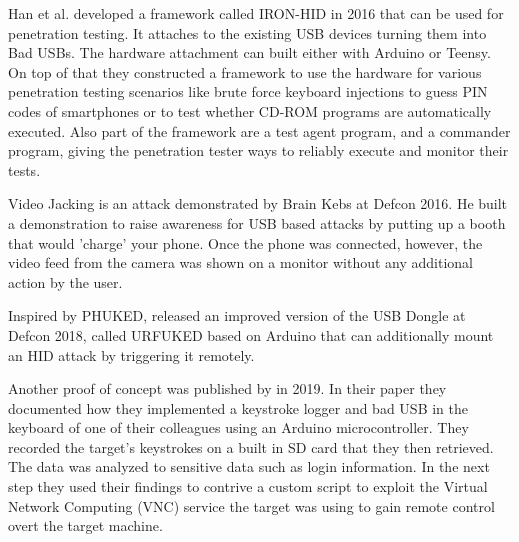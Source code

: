 Han et al.\cite{hanIRONHIDCreateYour2016} developed a framework called IRON-HID in 2016 that can be used for penetration testing. It attaches to the existing USB devices turning them into Bad USBs. The hardware attachment can built either with Arduino or Teensy. On top of that they constructed a framework to use the hardware for various penetration testing scenarios like brute force keyboard injections to guess PIN codes of smartphones or to test whether CD-ROM programs are automatically executed. Also part of the framework are a test agent program, and a commander program, giving the penetration tester ways to reliably execute and monitor their tests.   

Video Jacking is an attack demonstrated by Brain Kebs \cite{RoadWarriorsBeware2016} at Defcon 2016. He built a demonstration to raise awareness for USB based attacks by putting up a booth that would 'charge' your phone. Once the phone was connected, however, the video feed from the camera was shown on a monitor without any additional action by the user. 

Inspired by PHUKED, \cite{elkinsHackingHardwareIntroducing} released an improved version of the USB Dongle at Defcon 2018, called URFUKED based on Arduino that can additionally mount an HID attack by triggering it remotely.  

Another proof of concept was published by \cite{bojovicRisingThreatHardware2019} in 2019. In their paper they documented how they implemented a keystroke logger and bad USB in the keyboard of one of their colleagues using an Arduino microcontroller. They recorded the target's keystrokes on a built in SD card that they then retrieved. The data was analyzed to sensitive data such as login information. In the next step they used their findings to contrive a custom script to exploit the Virtual Network Computing (VNC) service the target was using to gain remote control overt the target machine. 

